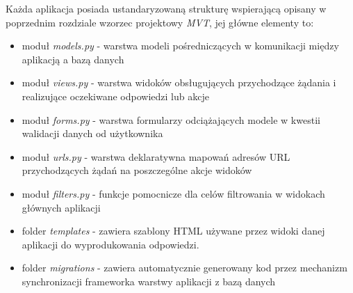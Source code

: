 \documentclass[declaration,shortabstract]{iithesis}
\begin{document}
Każda aplikacja posiada ustandaryzowaną strukturę wspierającą opisany w poprzednim rozdziale wzorzec projektowy \emph{MVT}, jej główne elementy to:
\begin{itemize}
	\item moduł \emph{models.py} - warstwa modeli pośredniczących w komunikacji między aplikacją a bazą danych
	\item moduł \emph{views.py} - warstwa widoków obsługujących przychodzące żądania i realizujące oczekiwane odpowiedzi lub akcje
	\item moduł \emph{forms.py} - warstwa formularzy odciążających modele w kwestii walidacji danych od użytkownika
	\item moduł \emph{urls.py} - warstwa deklaratywna mapowań adresów URL przychodzących żądań na poszczególne akcje widoków
	\item moduł \emph{filters.py} - funkcje pomocnicze dla celów filtrowania w widokach głównych aplikacji
	\item folder \emph{templates} - zawiera szablony HTML używane przez widoki danej aplikacji do wyprodukowania odpowiedzi.  
	\item folder \emph{migrations} - zawiera automatycznie generowany kod przez mechanizm synchronizacji frameworka 
	warstwy aplikacji z bazą danych
\end{itemize}
\end{document}

